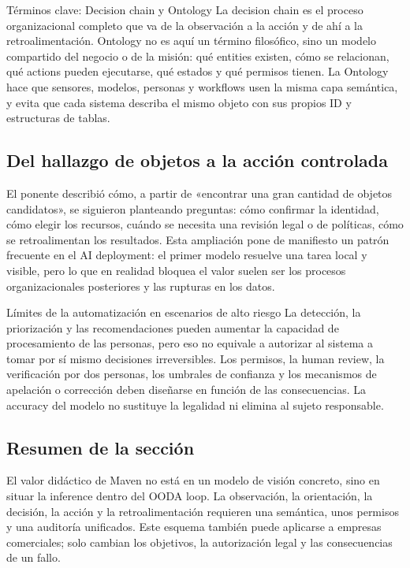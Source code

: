 \documentclass[a4paper]{article}
\begin{document}
\begin{importantbox}{Términos clave: Decision chain y Ontology}
La decision chain es el proceso organizacional completo que va de la observación a la acción y de ahí a la retroalimentación. Ontology no es aquí un término filosófico, sino un modelo compartido del negocio o de la misión: qué entities existen, cómo se relacionan, qué actions pueden ejecutarse, qué estados y qué permisos tienen. La Ontology hace que sensores, modelos, personas y workflows usen la misma capa semántica, y evita que cada sistema describa el mismo objeto con sus propios ID y estructuras de tablas.
\end{importantbox}

\subsection{Del hallazgo de objetos a la acción controlada}

El ponente describió cómo, a partir de «encontrar una gran cantidad de objetos candidatos», se siguieron planteando preguntas: cómo confirmar la identidad, cómo elegir los recursos, cuándo se necesita una revisión legal o de políticas, cómo se retroalimentan los resultados. Esta ampliación pone de manifiesto un patrón frecuente en el AI deployment: el primer modelo resuelve una tarea local y visible, pero lo que en realidad bloquea el valor suelen ser los procesos organizacionales posteriores y las rupturas en los datos.

\begin{warningbox}{Límites de la automatización en escenarios de alto riesgo}
La detección, la priorización y las recomendaciones pueden aumentar la capacidad de procesamiento de las personas, pero eso no equivale a autorizar al sistema a tomar por sí mismo decisiones irreversibles. Los permisos, la human review, la verificación por dos personas, los umbrales de confianza y los mecanismos de apelación o corrección deben diseñarse en función de las consecuencias. La accuracy del modelo no sustituye la legalidad ni elimina al sujeto responsable.
\end{warningbox}

\subsection{Resumen de la sección}

El valor didáctico de Maven no está en un modelo de visión concreto, sino en situar la inference dentro del OODA loop. La observación, la orientación, la decisión, la acción y la retroalimentación requieren una semántica, unos permisos y una auditoría unificados. Este esquema también puede aplicarse a empresas comerciales; solo cambian los objetivos, la autorización legal y las consecuencias de un fallo.
\end{document}
